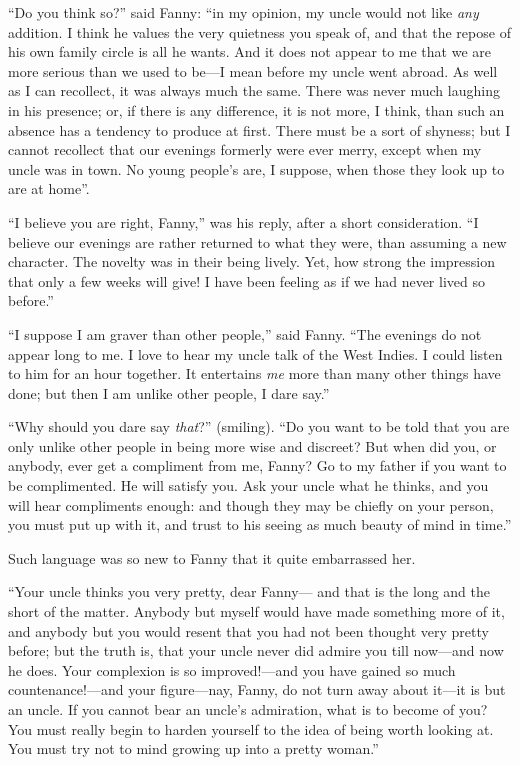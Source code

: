 ``Do you think so?'' said Fanny:  ``in my opinion,
my uncle would not like \emph{any} addition.  I think he
values the very quietness you speak of, and that the
repose of his own family circle is all he wants.
And it does not appear to me that we are more serious
than we used to be---I mean before my uncle went abroad.
As well as I can recollect, it was always much the same.
There was never much laughing in his presence; or,
if there is any difference, it is not more, I think,
than such an absence has a tendency to produce at first.
There must be a sort of shyness; but I cannot recollect
that our evenings formerly were ever merry, except when
my uncle was in town.  No young people's are, I suppose,
when those they look up to are at home''.

``I believe you are right, Fanny,'' was his reply, after a
short consideration.  ``I believe our evenings are rather
returned to what they were, than assuming a new character.
The novelty was in their being lively.  Yet, how strong
the impression that only a few weeks will give!
I have been feeling as if we had never lived so before.''

``I suppose I am graver than other people,'' said Fanny.
``The evenings do not appear long to me.  I love to hear
my uncle talk of the West Indies.  I could listen to him
for an hour together.  It entertains \emph{me} more than many
other things have done; but then I am unlike other people,
I dare say.''

``Why should you dare say \emph{that}?'' (smiling). ``Do you
want to be told that you are only unlike other people
in being more wise and discreet?  But when did you,
or anybody, ever get a compliment from me, Fanny?
Go to my father if you want to be complimented.
He will satisfy you.  Ask your uncle what he thinks,
and you will hear compliments enough:  and though they
may be chiefly on your person, you must put up with it,
and trust to his seeing as much beauty of mind in time.''

Such language was so new to Fanny that it quite embarrassed her.

``Your uncle thinks you very pretty, dear Fanny---%
and that is the long and the short of the matter.
Anybody but myself would have made something more of it,
and anybody but you would resent that you had not been
thought very pretty before; but the truth is, that your
uncle never did admire you till now---and now he does.
Your complexion is so improved!---and you have gained
so much countenance!---and your figure---nay, Fanny, do not
turn away about it---it is but an uncle.  If you cannot
bear an uncle's admiration, what is to become of you?
You must really begin to harden yourself to the idea of
being worth looking at.  You must try not to mind growing
up into a pretty woman.''

